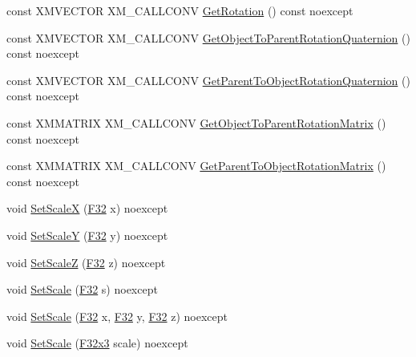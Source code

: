 \begin{DoxyCompactItemize}
\item 
const X\+M\+V\+E\+C\+T\+OR X\+M\+\_\+\+C\+A\+L\+L\+C\+O\+NV \mbox{\hyperlink{classmage_1_1_transform_a68da6687db138d4351dbb4859afad477}{Get\+Rotation}} () const noexcept
\item 
const X\+M\+V\+E\+C\+T\+OR X\+M\+\_\+\+C\+A\+L\+L\+C\+O\+NV \mbox{\hyperlink{classmage_1_1_transform_a26cc5edc32e86bad8f3b798b39206998}{Get\+Object\+To\+Parent\+Rotation\+Quaternion}} () const noexcept
\item 
const X\+M\+V\+E\+C\+T\+OR X\+M\+\_\+\+C\+A\+L\+L\+C\+O\+NV \mbox{\hyperlink{classmage_1_1_transform_adb8a034a1abc3a7d0e2cfd92867596e2}{Get\+Parent\+To\+Object\+Rotation\+Quaternion}} () const noexcept
\item 
const X\+M\+M\+A\+T\+R\+IX X\+M\+\_\+\+C\+A\+L\+L\+C\+O\+NV \mbox{\hyperlink{classmage_1_1_transform_a2f86a149ce70931f0019ebbe740ba30f}{Get\+Object\+To\+Parent\+Rotation\+Matrix}} () const noexcept
\item 
const X\+M\+M\+A\+T\+R\+IX X\+M\+\_\+\+C\+A\+L\+L\+C\+O\+NV \mbox{\hyperlink{classmage_1_1_transform_a95019381ff6b40edc197743ac93126c6}{Get\+Parent\+To\+Object\+Rotation\+Matrix}} () const noexcept
\item 
void \mbox{\hyperlink{classmage_1_1_transform_a6adbe2205f8db80107a2046eb7a9566a}{Set\+ScaleX}} (\mbox{\hyperlink{namespacemage_aa97e833b45f06d60a0a9c4fc22ae02c0}{F32}} x) noexcept
\item 
void \mbox{\hyperlink{classmage_1_1_transform_a953a89b7f7ed2ec47eb05074d43e35c6}{Set\+ScaleY}} (\mbox{\hyperlink{namespacemage_aa97e833b45f06d60a0a9c4fc22ae02c0}{F32}} y) noexcept
\item 
void \mbox{\hyperlink{classmage_1_1_transform_aa8fa7169c739cd1e005bbb373ccbf6c3}{Set\+ScaleZ}} (\mbox{\hyperlink{namespacemage_aa97e833b45f06d60a0a9c4fc22ae02c0}{F32}} z) noexcept
\item 
void \mbox{\hyperlink{classmage_1_1_transform_acf366489ae37e771e3f7b06c6452cb33}{Set\+Scale}} (\mbox{\hyperlink{namespacemage_aa97e833b45f06d60a0a9c4fc22ae02c0}{F32}} s) noexcept
\item 
void \mbox{\hyperlink{classmage_1_1_transform_a0a2d5430c745a27c5acaff472ba8b82e}{Set\+Scale}} (\mbox{\hyperlink{namespacemage_aa97e833b45f06d60a0a9c4fc22ae02c0}{F32}} x, \mbox{\hyperlink{namespacemage_aa97e833b45f06d60a0a9c4fc22ae02c0}{F32}} y, \mbox{\hyperlink{namespacemage_aa97e833b45f06d60a0a9c4fc22ae02c0}{F32}} z) noexcept
\item 
void \mbox{\hyperlink{classmage_1_1_transform_af58ea183306870969dd4e2864630cfa7}{Set\+Scale}} (\mbox{\hyperlink{namespacemage_a1e3c7a882af461f161caa1cbddaf1fa2}{F32x3}} scale) noexcept

\end{DoxyCompactItemize}

